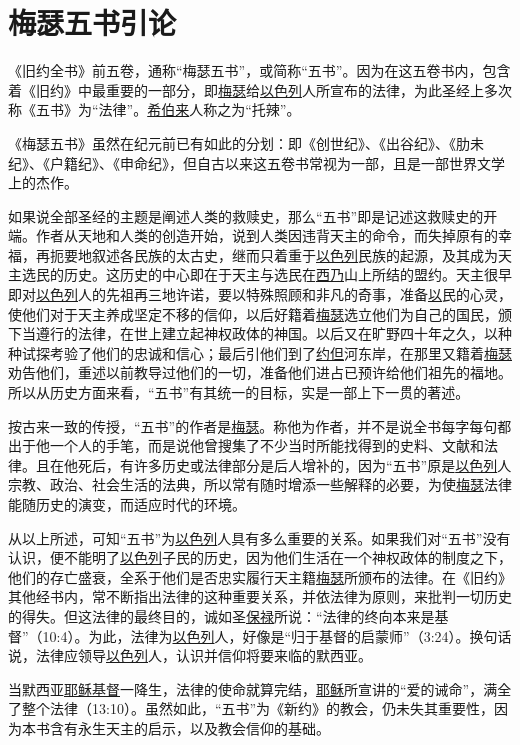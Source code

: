 \chapter*{梅瑟五书引论}


《旧约全书》前五卷，通称“梅瑟五书”，或简称“五书”。因为在这五卷书内，包含着《旧约》中最重要的一部分，即\uline{梅瑟}给\uline{以色列}人所宣布的法律，为此圣经上多次称《五书》为“法律”。\uline{希伯来}人称之为“托辣”。

《梅瑟五书》虽然在纪元前已有如此的分划：即《创世纪》、《出谷纪》、《肋未纪》、《户籍纪》、《申命纪》，但自古以来这五卷书常视为一部，且是一部世界文学上的杰作。

如果说全部圣经的主题是阐述人类的救赎史，那么“五书”即是记述这救赎史的开端。作者从天地和人类的创造开始，说到人类因违背天主的命令，而失掉原有的幸福，再扼要地叙述各民族的太古史，继而只着重于\uline{以色列}民族的起源，及其成为天主选民的历史。这历史的中心即在于天主与选民在\uline{西乃}山上所结的盟约。天主很早即对\uline{以色列}人的先祖再三地许诺，要以特殊照顾和非凡的奇事，准备\uline{以}民的心灵，使他们对于天主养成坚定不移的信仰，以后好籍着\uline{梅瑟}选立他们为自己的国民，颁下当遵行的法律，在世上建立起神权政体的神国。以后又在旷野四十年之久，以种种试探考验了他们的忠诚和信心；最后引他们到了\uline{约但}河东岸，在那里又籍着\uline{梅瑟}劝告他们，重述以前教导过他们的一切，准备他们进占已预许给他们祖先的福地。所以从历史方面来看，“五书”有其统一的目标，实是一部上下一贯的著述。

按古来一致的传授，“五书”的作者是\uline{梅瑟}。称他为作者，并不是说全书每字每句都出于他一个人的手笔，而是说他曾搜集了不少当时所能找得到的史料、文献和法律。且在他死后，有许多历史或法律部分是后人增补的，因为“五书”原是\uline{以色列}人宗教、政治、社会生活的法典，所以常有随时增添一些解释的必要，为使\uline{梅瑟}法律能随历史的演变，而适应时代的环境。

从以上所述，可知“五书”为\uline{以色列}人具有多么重要的关系。如果我们对“五书”没有认识，便不能明了\uline{以色列}子民的历史，因为他们生活在一个神权政体的制度之下，他们的存亡盛衰，全系于他们是否忠实履行天主籍\uline{梅瑟}所颁布的法律。在《旧约》其他经书内，常不断指出法律的这种重要关系，并依法律为原则，来批判一切历史的得失。但这法律的最终目的，诚如圣\uline{保禄}所说：“法律的终向本来是基督”（10:4）。为此，法律为\uline{以色列}人，好像是“归于基督的启蒙师”（3:24）。换句话说，法律应领导\uline{以色列}人，认识并信仰将要来临的默西亚。

当默西亚\uline{耶稣}\uline{基督}一降生，法律的使命就算完结，\uline{耶稣}所宣讲的“爱的诫命”，满全了整个法律（13:10）。虽然如此，“五书”为《新约》的教会，仍未失其重要性，因为本书含有永生天主的启示，以及教会信仰的基础。